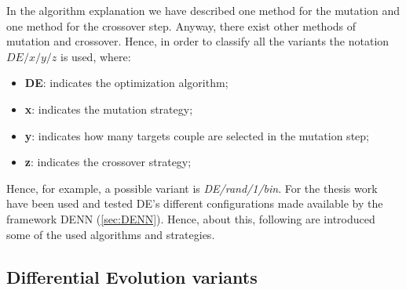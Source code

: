 In the algorithm explanation we have described one method for the mutation and one method for the crossover step. Anyway, there exist other methods of mutation and crossover. Hence, in order to classify all the variants the notation $DE/x/y/z$ is used, where:
\begin{itemize}
	\item{\textbf{DE}: indicates the optimization algorithm;}
	\item{\textbf{x}: indicates the mutation strategy;}
	\item{\textbf{y}: indicates how many targets couple are selected in the mutation step;}
	\item{\textbf{z}: indicates the crossover strategy;}
\end{itemize}
Hence, for example, a possible variant is \textit{DE/rand/1/bin}. For the thesis work have been used and tested DE's different configurations made available by the framework DENN (\ref{sec:DENN}). Hence, about this, following are introduced some of the used algorithms and strategies.
\subsection{Differential Evolution variants}
